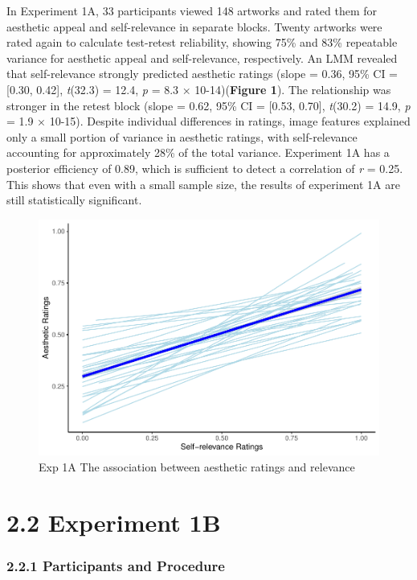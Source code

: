 \documentclass[
  man]{apa6}
\begin{document}
In Experiment 1A, 33 participants viewed 148 artworks and rated them for aesthetic appeal and self-relevance in separate blocks. Twenty artworks were rated again to calculate test-retest reliability, showing 75\% and 83\% repeatable variance for aesthetic appeal and self-relevance, respectively. An LMM revealed that self-relevance strongly predicted aesthetic ratings (slope = 0.36, 95\% CI = {[}0.30, 0.42{]}, \emph{t}(32.3) = 12.4, \emph{p} = 8.3 × 10-14)(\textbf{Figure 1}). The relationship was stronger in the retest block (slope = 0.62, 95\% CI = {[}0.53, 0.70{]}, \emph{t}(30.2) = 14.9, \emph{p} = 1.9 × 10-15). Despite individual differences in ratings, image features explained only a small portion of variance in aesthetic ratings, with self-relevance accounting for approximately 28\% of the total variance.
Experiment 1A has a posterior efficiency of 0.89, which is sufficient to detect a correlation of \emph{r} = 0.25. This shows that even with a small sample size, the results of experiment 1A are still statistically significant.

\begin{figure}
\centering
\includegraphics{11_files/figure-latex/unnamed-chunk-1-1.pdf}
\caption{\label{fig:unnamed-chunk-1}Exp 1A The association between aesthetic ratings and relevance}
\end{figure}

\hypertarget{experiment-1b}{%
\section{2.2 Experiment 1B}\label{experiment-1b}}

\hypertarget{participants-and-procedure-1}{%
\subsubsection{2.2.1 Participants and Procedure}\label{participants-and-procedure-1}}
\end{document}
